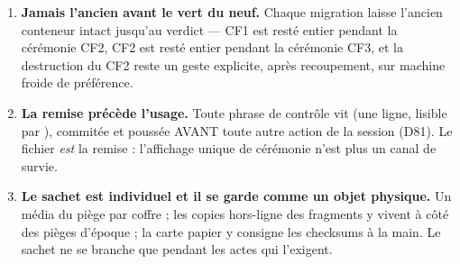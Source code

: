 \begin{enumerate}
\item \textbf{Jamais l'ancien avant le vert du neuf.} Chaque migration laisse l'ancien
conteneur intact jusqu'au verdict — CF1 est resté entier pendant la cérémonie CF2, CF2
est resté entier pendant la cérémonie CF3, et la destruction du CF2 reste un geste
explicite, après recoupement, sur machine froide de préférence.
\item \textbf{La remise précède l'usage.} Toute phrase de contrôle vit
 (une ligne, lisible par ),
commitée et poussée AVANT toute autre action de la session (D81). Le fichier \emph{est}
la remise : l'affichage unique de cérémonie n'est plus un canal de survie.
\item \textbf{Le sachet est individuel et il se garde comme un objet physique.} Un
média du piège par coffre ; les copies hors-ligne des fragments y vivent à côté des
pièges d'époque ; la carte papier y consigne les checksums à la main. Le sachet ne se
branche que pendant les actes qui l'exigent.
\end{enumerate}
